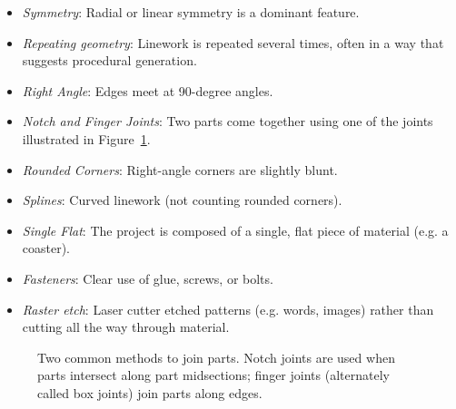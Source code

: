 \documentclass{article}
\begin{document}
\begin{itemize}
\item \textit{Symmetry}: Radial or linear symmetry is a dominant feature.
\item \textit{Repeating geometry}: Linework is repeated several times,
  often in a way that suggests procedural generation.
\item \textit{Right Angle}: Edges meet at 90-degree angles.
\item \textit{Notch and Finger Joints}: Two parts come together using one of
  the joints illustrated in Figure~\ref{fig:joint}.
\item \textit{Rounded Corners}: Right-angle corners are slightly blunt.
\item \textit{Splines}: Curved linework (not counting rounded corners).
\item \textit{Single Flat}: The project is composed of a single, flat
  piece of material (e.g. a coaster).
\item \textit{Fasteners}: Clear use of glue, screws, or bolts.
\item \textit{Raster etch}: Laser cutter etched patterns (e.g. words,
  images) rather than cutting all the way through material.
\end{itemize}

\begin{figure}[h]
\centering 
{}
\caption{Two common methods to join parts. Notch joints are used when
  parts intersect along part midsections; finger joints (alternately
  called box joints) join parts along edges.}
\label{fig:joint}
\end{figure}
\end{document}
